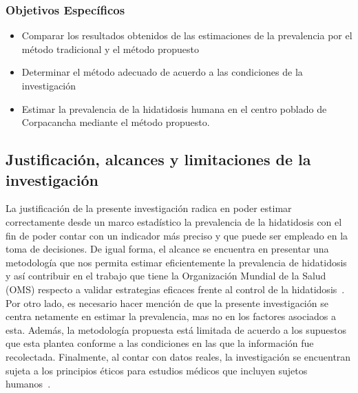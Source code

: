 \subsubsection{Objetivos Específicos}
\begin{itemize}
    \item Comparar los resultados obtenidos de las estimaciones de la prevalencia por el método tradicional y el método propuesto
    \item Determinar el método adecuado de acuerdo a las condiciones de la investigación
    \item Estimar la prevalencia de la hidatidosis humana en el centro poblado de Corpacancha mediante el método propuesto.
\end{itemize}
\newpage
\subsection{Justificación, alcances y limitaciones de la investigación}
La justificación de la presente investigación radica en poder estimar correctamente desde un marco estadístico la prevalencia de la hidatidosis con el fin de poder contar con un indicador más preciso y que puede ser empleado en la toma de decisiones. De igual forma, el alcance se encuentra en presentar una metodología que nos permita estimar eficientemente la prevalencia de hidatidosis y así contribuir en el trabajo que tiene la Organización Mundial de la Salud (OMS) respecto a validar estrategias eficaces frente al control de la hidatidosis~\cite{who2020}. Por otro lado, es necesario hacer mención de que la presente investigación se centra netamente en estimar la prevalencia, mas no en los factores asociados a esta. Además, la metodología propuesta está limitada de acuerdo a los supuestos que esta plantea conforme a las condiciones en las que la información fue recolectada. Finalmente, al contar con datos reales, la investigación se encuentran sujeta a los principios éticos para estudios médicos que incluyen sujetos humanos~\cite{general2014world}.
